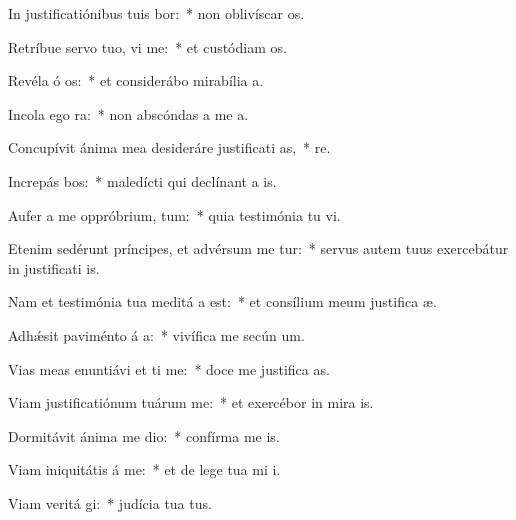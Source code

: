 \item In justificatiónibus tuis bor:~* non oblivíscar  os.
\item Retríbue servo tuo, vi me:~* et custódiam  os.
\item Revéla ó os:~* et considerábo mirabília   a.
\item Incola ego   ra:~* non abscóndas a me  a.
\item Concupívit ánima mea desideráre justificati as,~*   re.
\item Increpás bos:~* maledícti qui declínant a  is.
\item Aufer a me oppróbrium,  tum:~* quia testimónia tu vi.
\item Etenim sedérunt príncipes, et advérsum me tur:~* servus autem tuus exercebátur in justificati is.
\item Nam et testimónia tua meditá a est:~* et consílium meum justifica æ.
\item Adhǽsit paviménto á a:~* vivífica me secún  um.
\item Vias meas enuntiávi et ti me:~* doce me justifica as.
\item Viam justificatiónum tuárum  me:~* et exercébor in mira is.
\item Dormitávit ánima me  dio:~* confírma me   is.
\item Viam iniquitátis á  me:~* et de lege tua mi i.
\item Viam veritá gi:~* judícia tua   tus.

